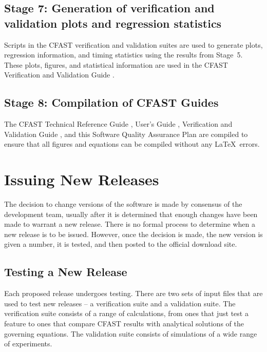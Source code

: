 \documentclass[12pt]{book}
\begin{document}
\subsection*{Stage 7: Generation of verification and validation plots and regression statistics}

Scripts in the CFAST verification and validation suites are used to generate plots, regression information, and timing statistics using the results from Stage~5. These plots, figures, and statistical information are used in the CFAST Verification and Validation Guide \cite{CFAST_Valid_Guide_7}.

\subsection*{Stage 8: Compilation of CFAST Guides}

The CFAST Technical Reference Guide \cite{CFAST_Tech_Guide_7}, User's Guide \cite{CFAST_Users_Guide_7}, Verification and Validation Guide \cite{CFAST_Valid_Guide_7}, and this Software Quality Assurance Plan are compiled to ensure that all figures and equations can be compiled without any \LaTeX\ errors.

\section{Issuing New Releases}

The decision to change versions of the software is made by consensus of the development team, usually after it is determined that enough changes have been made to warrant a new release. There is no formal process to determine when a new release is to be issued. However, once the decision is made, the new version is given a number, it is tested, and then posted to the official download site.

\subsection{Testing a New Release}

Each proposed release undergoes testing. There are two sets of input files that are used to test new releases -- a verification suite and a validation suite. The verification suite consists of a range of calculations, from ones that just test a feature to ones that compare CFAST results with analytical solutions of the governing equations. The validation suite consists of simulations of a wide range of experiments.
\end{document}
